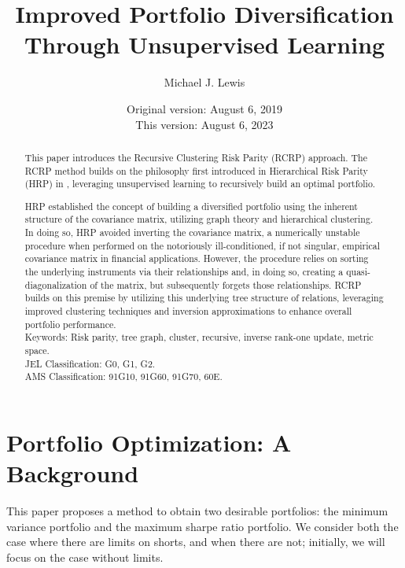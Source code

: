 \documentclass[10pt,twoside,titlepage]{article}   %
\newcommand\blankpage{%
    \null
    \thispagestyle{empty}%
    \addtocounter{page}{-1}%
    \newpage}
\begin{document}
\title{Improved Portfolio Diversification Through Unsupervised Learning}
\author{Michael J. Lewis}
\date{
Original version: August 6, 2019 \\
This version: August 6, 2023 }

\maketitle

\begin{abstract}
This paper introduces the Recursive Clustering Risk Parity (RCRP) approach. 
The RCRP method builds on the philosophy first introduced in Hierarchical Risk Parity (HRP) in \cite{HRP}, leveraging unsupervised learning to recursively build an optimal portfolio. 

HRP established the concept of building a diversified portfolio using the inherent structure of the covariance matrix, utilizing graph theory and hierarchical clustering. In doing so, HRP avoided inverting the covariance matrix, a numerically unstable procedure when performed on the notoriously ill-conditioned, if not singular, empirical covariance matrix in financial applications. However, the procedure relies on sorting the underlying instruments via their relationships and, in doing so, creating a quasi-diagonalization of the matrix, but subsequently forgets those relationships. RCRP builds on this premise by utilizing this underlying tree structure of relations, leveraging improved clustering techniques and inversion approximations to enhance overall portfolio performance.\\
Keywords: Risk parity, tree graph, cluster, recursive, inverse rank-one update, metric space.\\
JEL Classification: G0, G1, G2.\\
AMS Classification: 91G10, 91G60, 91G70, 60E.\\
\end{abstract}

\section{Portfolio Optimization: A Background}\label{sec-intro}
This paper proposes a method to obtain two desirable portfolios: the minimum variance portfolio and the maximum sharpe ratio portfolio. 
We consider both the case where there are limits on shorts, and when there are not; initially, we will focus on the case without limits.
\end{document}

